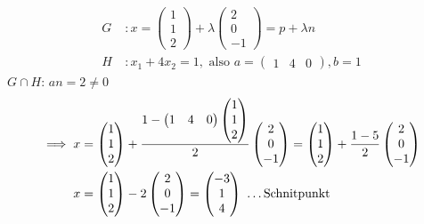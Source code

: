 \begin{example}
    \begin{align*}
        G\ &: x = \begin{pmatrix}
            1\\ 1\\ 2
        \end{pmatrix} + \lambda \begin{pmatrix}
            2\\ 0\\ -1
        \end{pmatrix} = p + \lambda n\\
        H\ &: x_1 + 4x_2 = 1, \text{ also } a = \begin{pmatrix}
            1 & 4 & 0
        \end{pmatrix}, b = 1
    \end{align*}
    \underline{$G\cap H$}: $an = 2 \neq 0$
    \begin{align*}
        \implies x &= \begin{pmatrix}
            1\\ 1\\ 2
        \end{pmatrix} + \frac{1 - \begin{pmatrix} 1&4&0 \end{pmatrix}
        \begin{pmatrix}1\\1\\2\end{pmatrix}}{2}\begin{pmatrix}
            2\\0\\-1
        \end{pmatrix} = \begin{pmatrix}
            1\\1\\2
        \end{pmatrix} + \frac{1 - 5}{2} \begin{pmatrix}
            2\\0\\-1
        \end{pmatrix}\\
        x &=\begin{pmatrix}
            1\\1\\2
        \end{pmatrix} - 2 \begin{pmatrix}
            2\\0\\-1
        \end{pmatrix} = \begin{pmatrix}
            -3\\1\\4
        \end{pmatrix}\text{ \dots Schnitpunkt}
    \end{align*}
\end{example}